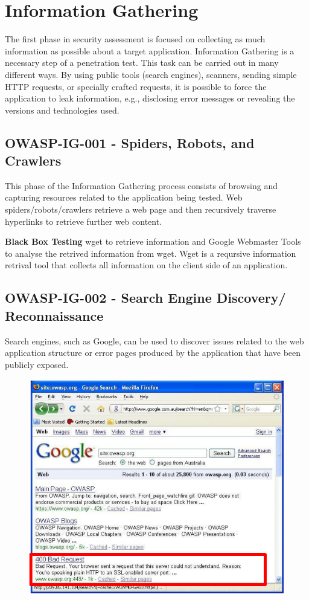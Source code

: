 \chapter{Information Gathering}

	The first phase in security assessment is focused on collecting as much information as 
	possible about a target application. Information Gathering is a necessary step of a penetration 
	test. This task can be carried out in many different ways. By using public tools (search engines),
	scanners, sending simple HTTP requests, or specially crafted requests, it is possible to force 
	the application to leak information, e.g., disclosing error messages or revealing the versions 
	and technologies used.

		\clearpage
		\section{OWASP-IG-001 - Spiders, Robots, and Crawlers}
			This phase of the Information Gathering process consists of browsing and capturing resources 
			related to the application being tested.  Web spiders/robots/crawlers retrieve a web page and 
			then recursively traverse hyperlinks to retrieve further web content.

			{\bf Black Box Testing} wget to retrieve information and Google Webmaster Tools to analyse 
			the retrived information from wget. Wget is a reqursive information retrival tool that collects 
			all information on the client side of an application. 

		\section{OWASP-IG-002 - Search Engine Discovery/ Reconnaissance}
			Search engines, such as Google, can be used to discover issues related to the web application
			structure or error pages produced by the application that have been publicly exposed.

			\begin{figure}[H]
				\includegraphics[width=\textwidth]{pics/searchEngine.png}
			\end{figure}



